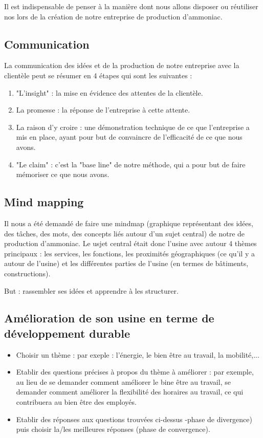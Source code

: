 Il est indispensable de penser à la manière dont nous allons disposer ou réutiliser nos lors de la création de notre entreprise de production d'ammoniac.

\subsection{Communication}
La communication des idées et de la production de notre entreprise avec la clientèle peut se résumer 
en 4 étapes qui sont les suivantes :

\begin{enumerate}
	\item "L'insight" : la mise en évidence des attentes de la clientèle.
	\item La promesse : la réponse de l'entreprise à cette attente.
	\item La raison d'y croire : une démonstration technique de ce que l'entreprise a mis en place,
	ayant pour but de convaincre de l'efficacité de ce que nous avons.
	\item "Le claim" : c'est la "base line" de notre méthode, qui a pour but de faire mémoriser ce que nous avons.
\end{enumerate}

\subsection{Mind mapping}
Il nous a été demandé de faire une mindmap (graphique représentant des idées, des tâches, des mots,
des concepts liés autour d'un sujet central) de notre de production d'ammoniac.
Le usjet central était donc l'usine avec autour 4 thèmes principaux : les services, les fonctions,
les proximités géographiques (ce qu'il y a autour de l'usine) et les différentes parties de l'usine
(en termes de bâtiments, constructions).

But : rassembler ses idées et apprendre à les structurer.

\subsection{Amélioration de son usine en terme de développement durable}

\begin{itemize}
	\item Choisir un thème : par exeple : l'énergie, le bien être au travail, la mobilité,...
	\item Etablir des questions précises à propos du thème à améliorer : par exemple, au lieu de se
	demander comment améliorer le bine être au travail, se demander comment améliorer la flexibilité
	des horaires au travail, ce qui contribuera au bien être des employés.
	\item Etablir des réponses aux questions trouvées ci-dessus -phase de divergence) puis choisir
	la/les meilleures réponses (phase de convergence).
\end{itemize}

